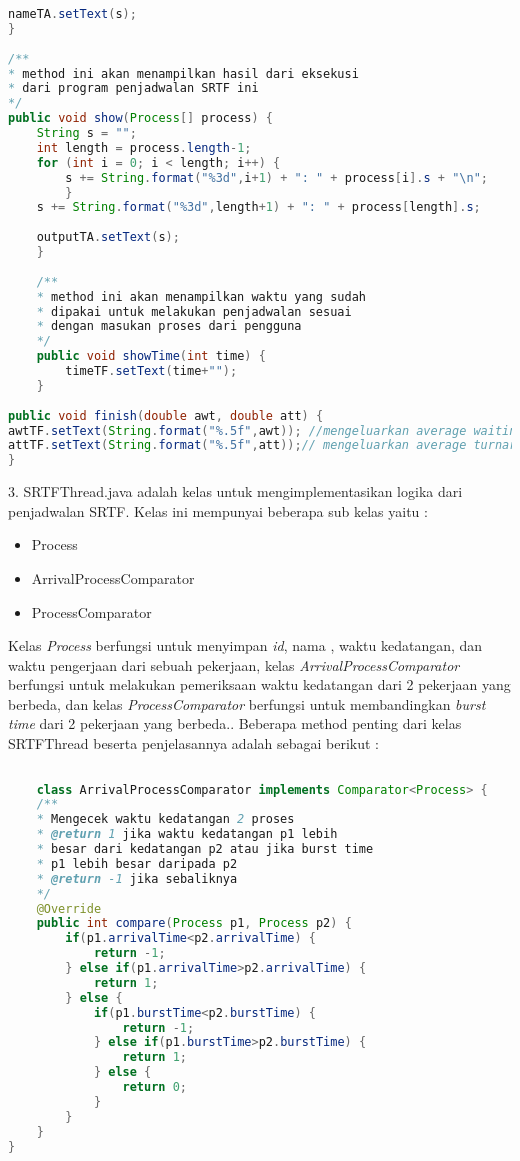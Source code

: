 \documentclass[a4paper,twoside]{article}
\begin{document}
\begin{enumerate}
\begin{lstlisting}[language=Java]
nameTA.setText(s);
}
    
/**
* method ini akan menampilkan hasil dari eksekusi
* dari program penjadwalan SRTF ini
*/
public void show(Process[] process) {
    String s = "";
    int length = process.length-1;
    for (int i = 0; i < length; i++) {
        s += String.format("%3d",i+1) + ": " + process[i].s + "\n";
        }
    s += String.format("%3d",length+1) + ": " + process[length].s;
        
    outputTA.setText(s);
    }
    
    /**
    * method ini akan menampilkan waktu yang sudah
    * dipakai untuk melakukan penjadwalan sesuai 
    * dengan masukan proses dari pengguna
    */
    public void showTime(int time) {
        timeTF.setText(time+"");
    }
    
public void finish(double awt, double att) {
awtTF.setText(String.format("%.5f",awt)); //mengeluarkan average waiting time
attTF.setText(String.format("%.5f",att));// mengeluarkan average turnaroundtime
}
		\end{lstlisting}
		3. SRTFThread.java adalah kelas untuk mengimplementasikan logika dari penjadwalan SRTF. Kelas ini mempunyai beberapa sub kelas yaitu :{\it 
		\begin{itemize}
		\item Process
		\item ArrivalProcessComparator
		\item ProcessComparator
		\end{itemize}
		}
		Kelas {\it Process} berfungsi untuk menyimpan {\it id}, nama , waktu kedatangan, dan waktu pengerjaan dari sebuah pekerjaan, kelas {\it ArrivalProcessComparator} berfungsi untuk melakukan pemeriksaan waktu kedatangan dari 2 pekerjaan yang berbeda, dan kelas {\it ProcessComparator} berfungsi untuk membandingkan {\it burst time} dari 2 pekerjaan yang berbeda.. Beberapa method penting dari kelas SRTFThread beserta penjelasannya adalah sebagai berikut :\newline
		\begin{lstlisting}[language=Java]
		
	class ArrivalProcessComparator implements Comparator<Process> {
	/**
	* Mengecek waktu kedatangan 2 proses
	* @return 1 jika waktu kedatangan p1 lebih 
	* besar dari kedatangan p2 atau jika burst time 
	* p1 lebih besar daripada p2
	* @return -1 jika sebaliknya
	*/
	@Override
    public int compare(Process p1, Process p2) {
        if(p1.arrivalTime<p2.arrivalTime) {
            return -1; 
        } else if(p1.arrivalTime>p2.arrivalTime) {
            return 1;
        } else {
            if(p1.burstTime<p2.burstTime) {
                return -1;
            } else if(p1.burstTime>p2.burstTime) {
                return 1;
            } else {
                return 0;
            }
        }
    }
}


\end{lstlisting}
\end{enumerate}
\end{document}
